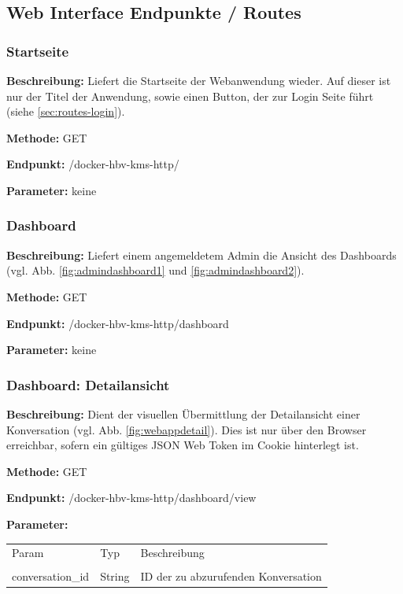 \subsection{Web Interface Endpunkte / Routes}
\label{sec:routes}
\dotfill
\subsubsection{Startseite}
\label{sec:routes-start}
\textbf{Beschreibung:} Liefert die Startseite der Webanwendung wieder. Auf dieser ist nur der Titel der Anwendung, sowie einen Button, der zur Login Seite führt (siehe \ref{sec:routes-login}).

\textbf{Methode:} GET

\textbf{Endpunkt:} /docker-hbv-kms-http/

\textbf{Parameter:}
keine

\dotfill

\subsubsection{Dashboard}
\label{sec:routes-dashboard}
\textbf{Beschreibung:} Liefert einem angemeldetem Admin die Ansicht des Dashboards (vgl. Abb. \ref{fig:admindashboard1} und \ref{fig:admindashboard2}).

\textbf{Methode:} GET

\textbf{Endpunkt:} /docker-hbv-kms-http/dashboard

\textbf{Parameter:}
keine

\dotfill

\subsubsection{Dashboard: Detailansicht}
\label{sec:routes-dashboard-detail}
\textbf{Beschreibung:} Dient der visuellen Übermittlung der Detailansicht einer Konversation (vgl. Abb. \ref{fig:webappdetail}). Dies ist nur über den Browser erreichbar, sofern ein gültiges JSON Web Token im Cookie hinterlegt ist.

\textbf{Methode:} GET

\textbf{Endpunkt:} /docker-hbv-kms-http/dashboard/view

\textbf{Parameter:}
\begin{table}[H]
    \label{table:/docker-hbv-kms-http/dashboard/view}
    \setlength{\tabcolsep}{3pt}
    \begin{tabular}{p{100pt}p{80pt}p{200pt}}
        \toprule
        Param            & Typ    & Beschreibung                        \\                                                             \\
        \midrule
        conversation\_id & String & ID der zu abzurufenden Konversation \\
        \bottomrule
    \end{tabular}
\end{table}
\dotfill

